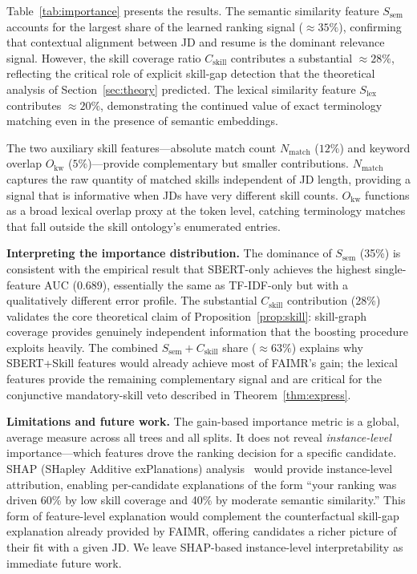 \documentclass[smallcondensed,numbers]{sn-jnl}
\begin{document}
Table~\ref{tab:importance} presents the results. The semantic similarity feature $S_\text{sem}$ accounts for the largest share of the learned ranking signal ($\approx 35\%$), confirming that contextual alignment between JD and resume is the dominant relevance signal. However, the skill coverage ratio $C_\text{skill}$ contributes a substantial $\approx 28\%$, reflecting the critical role of explicit skill-gap detection that the theoretical analysis of Section~\ref{sec:theory} predicted. The lexical similarity feature $S_\text{lex}$ contributes $\approx 20\%$, demonstrating the continued value of exact terminology matching even in the presence of semantic embeddings.

The two auxiliary skill features---absolute match count $N_\text{match}$ ($12\%$) and keyword overlap $O_\text{kw}$ ($5\%$)---provide complementary but smaller contributions. $N_\text{match}$ captures the raw quantity of matched skills independent of JD length, providing a signal that is informative when JDs have very different skill counts. $O_\text{kw}$ functions as a broad lexical overlap proxy at the token level, catching terminology matches that fall outside the skill ontology's enumerated entries.

\textbf{Interpreting the importance distribution.} The dominance of $S_\text{sem}$ (35\%) is consistent with the empirical result that SBERT-only achieves the highest single-feature AUC (0.689), essentially the same as TF-IDF-only but with a qualitatively different error profile. The substantial $C_\text{skill}$ contribution (28\%) validates the core theoretical claim of Proposition~\ref{prop:skill}: skill-graph coverage provides genuinely independent information that the boosting procedure exploits heavily. The combined $S_\text{sem} + C_\text{skill}$ share ($\approx 63\%$) explains why SBERT+Skill features would already achieve most of FAIMR's gain; the lexical features provide the remaining complementary signal and are critical for the conjunctive mandatory-skill veto described in Theorem~\ref{thm:express}.

\textbf{Limitations and future work.} The gain-based importance metric is a global, average measure across all trees and all splits. It does not reveal \textit{instance-level} importance---which features drove the ranking decision for a specific candidate. SHAP (SHapley Additive exPlanations) analysis~\cite{lundberg2017shap} would provide instance-level attribution, enabling per-candidate explanations of the form ``your ranking was driven 60\% by low skill coverage and 40\% by moderate semantic similarity.'' This form of feature-level explanation would complement the counterfactual skill-gap explanation already provided by FAIMR, offering candidates a richer picture of their fit with a given JD. We leave SHAP-based instance-level interpretability as immediate future work.
\end{document}
